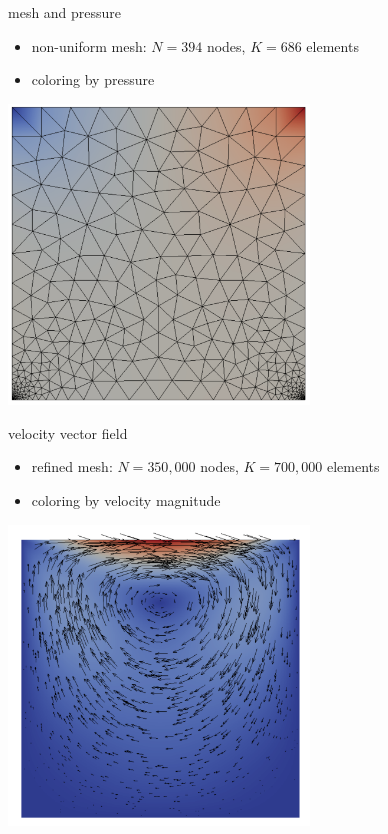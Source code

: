 \documentclass[hide notes,intlimits,usenames,dvipsnames]{beamer}
\begin{document}
\begin{frame}{mesh and pressure}

\begin{itemize}
\item non-uniform mesh: $N=394$ nodes, $K=686$ elements
\item coloring by pressure
\end{itemize}

\begin{center}
\includegraphics[width=0.6\textwidth]{lidbox-pressure-mesh}
\end{center}
\end{frame}


\begin{frame}{velocity vector field}

\begin{itemize}
\item refined mesh: $N=350,\!000$ nodes, $K=700,\!000$ elements
\item coloring by velocity magnitude
\end{itemize}

\begin{center}
\includegraphics[width=0.6\textwidth]{lidbox-velocity}
\end{center}
\end{frame}
\end{document}
